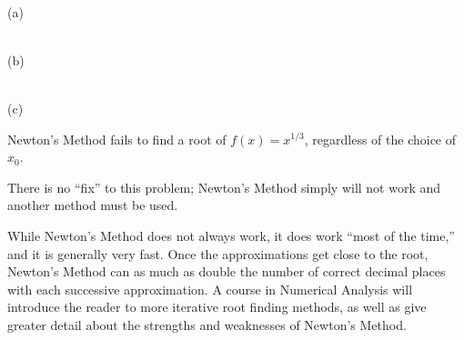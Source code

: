 {\noindent\begin{minipage}{.45\textwidth}\centering
{} \\ (a)
\end{minipage}\quad
\begin{minipage}{.45\textwidth}\centering
{} \\ (b)
\end{minipage}

\noindent\begin{minipage}{\textwidth}\centering
{} \\ (c)
\captionsetup{type=figure}%
\caption{Newton's Method fails to find a root of $f(x) = x^{1/3}$, regardless of the choice of $x_0$.}\label{fig:newt4}
\end{minipage}
}%
{
}

There is no ``fix'' to this problem; Newton's Method simply will not work and another method must be used.



While Newton's Method does not always work, it does work ``most of the time,'' and it is generally very fast. Once the approximations get close to the root, Newton's Method can as much as double the number of correct decimal places with each successive approximation. A course in Numerical Analysis will introduce the reader to more iterative root finding methods, as well as give greater detail about the strengths and weaknesses of Newton's Method.\bigskip


